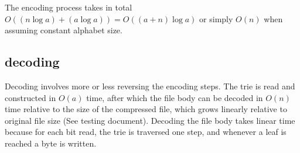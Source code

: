 \documentclass[11pt,a4paper,oneside,notitlepage,final]{article}
\begin{document}
	The encoding process takes in total $ O((n \log a) + (a \log a)) = O((a+n)\log a) $ or simply $ O(n) $ when assuming constant alphabet size.
	
	\subsection{decoding}
	
	Decoding involves more or less reversing the encoding steps.
	The trie is read and constructed in $ O(a) $ time, after which the file body can be decoded in $ O(n) $ time relative to the size of the compressed file, which grows linearly relative to original file size (See testing document). Decoding the file body takes linear time because for each bit read, the trie is traversed one step, and whenever a leaf is reached a byte is written.
\end{document}
